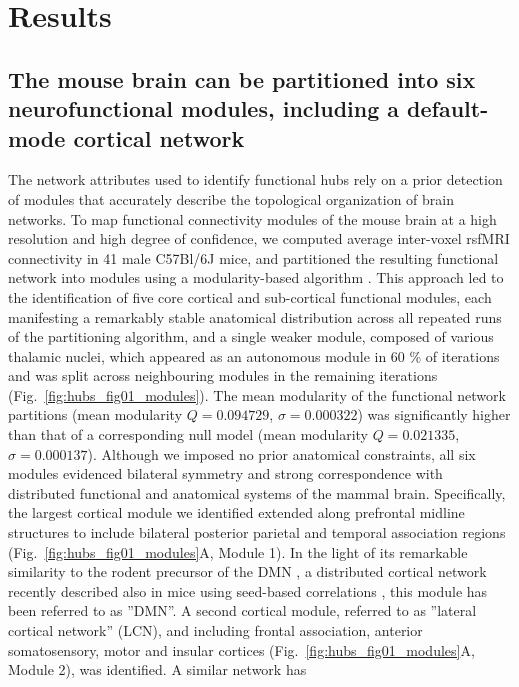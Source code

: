 \section{Results}

\subsection{The mouse brain can be partitioned into six neurofunctional modules,
including a default-mode cortical network}

The network attributes used to identify functional hubs rely on a prior
detection of modules that accurately describe the topological organization of
brain networks. To map functional connectivity modules of the mouse brain at a
high resolution and high degree of confidence, we computed average inter-voxel
rsfMRI connectivity in 41 male C57Bl/6J mice, and partitioned the resulting
functional network into modules using a modularity-based algorithm
\parencite{blondel2008,rubinov2011}. This approach led to the identification of
five core cortical and sub-cortical functional modules, each manifesting a
remarkably stable anatomical distribution across all repeated runs of the
partitioning algorithm, and a single weaker module, composed of various thalamic
nuclei, which appeared as an autonomous module in 60 \% of iterations and was
split across neighbouring modules in the remaining iterations
(Fig.~\ref{fig:hubs_fig01_modules}). The
mean modularity of the functional network partitions (mean modularity $Q =
0.094729$, $\sigma = 0.000322$) was significantly higher than that of a
corresponding null model (mean modularity $Q = 0.021335$, $\sigma = 0.000137$).
Although we imposed no prior anatomical constraints, all six modules evidenced
bilateral symmetry and strong correspondence with distributed functional and
anatomical systems of the mammal brain. Specifically, the largest cortical
module we identified extended along prefrontal midline structures to include
bilateral posterior parietal and temporal association regions
(Fig.~\ref{fig:hubs_fig01_modules}A, Module
1). In the light of its remarkable similarity to the rodent precursor of the DMN
\parencite{lu2012, schwarz2013, schwarz2012}, a distributed cortical network
recently described also in mice using seed-based correlations
\parencite{sforazzini2016, stafford2014}, this module has been referred to as
''DMN''. A second cortical module, referred to as ''lateral cortical network''
(LCN), and including frontal association, anterior somatosensory, motor and
insular cortices (Fig.~\ref{fig:hubs_fig01_modules}A, Module 2), was identified. A similar network has
